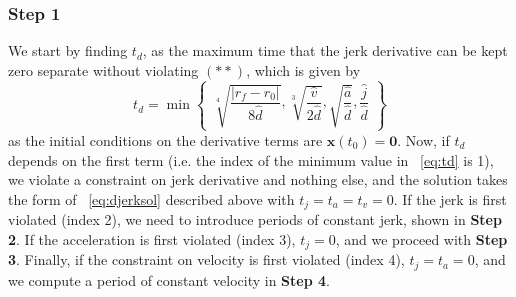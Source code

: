 \documentclass{article}
\begin{document}
\subsubsection*{Step 1}
We start by finding $t_d$, as the maximum time that the jerk derivative can be kept zero separate without violating $(**)$, which is given by
\begin{equation}\label{eq:td}
t_{d} = \min\begin{Bmatrix}\sqrt[4]{\dfrac{|r_f - r_0|}{8\hat{d}}}, \sqrt[3]{\dfrac{\hat{v}}{2\hat{d}}}, \sqrt{\dfrac{\hat{a}}{\hat{d}}},\dfrac{\hat{j}}{\hat{d}}\end{Bmatrix}
\end{equation}
as the initial conditions on the derivative terms are $\mathbf{x}(t_0) = \mathbf{0}$. Now, if $t_d$ depends on the first term (i.e. the index of the minimum value in ~\eqref{eq:td} is 1), we violate a constraint on jerk derivative and nothing else, and the solution takes the form of ~\eqref{eq:djerksol} described above with $t_j=t_a=t_v=0$. If the jerk is first violated (index 2), we need to introduce periods of constant jerk, shown in \textbf{Step 2}. If the acceleration is first violated (index 3), $t_j = 0$, and we proceed with \textbf{Step 3}. Finally, if the constraint on velocity is first violated (index 4), $t_j=t_a=0$, and we compute a period of constant velocity in \textbf{Step 4}.
\end{document}

